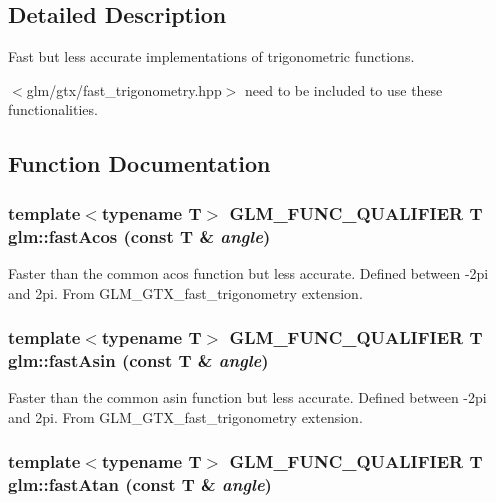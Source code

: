 \subsection{Detailed Description}
Fast but less accurate implementations of trigonometric functions. 

$<$glm/gtx/fast\_\-trigonometry.hpp$>$ need to be included to use these functionalities. 

\subsection{Function Documentation}
\hypertarget{group__gtx__fast__trigonometry_g7f5301bad6bd3a073be8882ac1f4f5d4}{
\subsubsection[fastAcos]{\setlength{\rightskip}{0pt plus 5cm}template$<$typename T$>$ GLM\_\-FUNC\_\-QUALIFIER T glm::fastAcos (const T \& {\em angle})}}
\label{group__gtx__fast__trigonometry_g7f5301bad6bd3a073be8882ac1f4f5d4}


Faster than the common acos function but less accurate. Defined between -2pi and 2pi. From GLM\_\-GTX\_\-fast\_\-trigonometry extension. \hypertarget{group__gtx__fast__trigonometry_g8c49efe243e7ad6ed58a3bcf07b560a0}{
\subsubsection[fastAsin]{\setlength{\rightskip}{0pt plus 5cm}template$<$typename T$>$ GLM\_\-FUNC\_\-QUALIFIER T glm::fastAsin (const T \& {\em angle})}}
\label{group__gtx__fast__trigonometry_g8c49efe243e7ad6ed58a3bcf07b560a0}


Faster than the common asin function but less accurate. Defined between -2pi and 2pi. From GLM\_\-GTX\_\-fast\_\-trigonometry extension. \hypertarget{group__gtx__fast__trigonometry_g0f10c61865500e4cfe86ad070e5d6312}{
\subsubsection[fastAtan]{\setlength{\rightskip}{0pt plus 5cm}template$<$typename T$>$ GLM\_\-FUNC\_\-QUALIFIER T glm::fastAtan (const T \& {\em angle})}}
\label{group__gtx__fast__trigonometry_g0f10c61865500e4cfe86ad070e5d6312}


